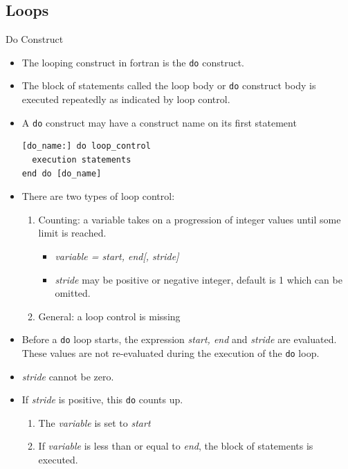 \documentclass[c,mathserif,compress,xcolor=svgnames]{beamer}
\newcommand*\vardiamond{\textcolor{tigerspurple}{%
  \ensuremath{\blacklozenge}}}
\newcommand{\lstfortran}[1]{\lstinline[language={[90]Fortran},basicstyle=\footnotesize\ttfamily]|#1|}
\begin{document}
\subsection{Loops}
\begin{frame}{Do Construct}
  \begin{itemize}
    \item The looping construct in fortran is the \lstfortran{do} construct.
    \item The block of statements called the loop body or \lstfortran{do} construct body is executed repeatedly as indicated by loop control.
    \item A \lstfortran{do} construct may have a construct name on its first statement
      \begin{lstlisting}[language={[90]Fortran},basicstyle=\fontsize{6}{7}\selectfont\ttfamily]
[do_name:] do loop_control
  execution statements
end do [do_name]
      \end{lstlisting}
    \item There are two types of loop control:
    \begin{enumerate}
      \item Counting: a variable takes on a progression of integer values until some limit is reached.
      \begin{itemize}
        \item[$\vardiamond$] \textit{variable = start, end[, stride] }
        \item[$\vardiamond$] \textit{stride} may be positive or negative integer, default is 1 which can be omitted.
      \end{itemize}
      \item General: a loop control is missing
    \end{enumerate}
    \item Before a \lstfortran{do} loop starts, the expression \textit{start, end} and \textit{stride} are evaluated. These values are not re-evaluated during the execution of the \lstfortran{do} loop.
    \item \textit{stride} cannot be zero.
    \item If \textit{stride} is positive, this \lstfortran{do} counts up.
    \begin{enumerate}
      \scriptsize
      \item The \textit{variable} is set to \textit{start}
      \item If \textit{variable} is less than or equal to \textit{end}, the block of statements is executed.

\end{enumerate}
\end{itemize}
\end{frame}
\end{document}
